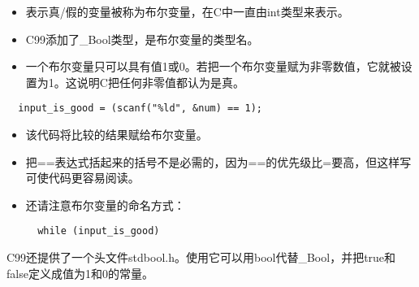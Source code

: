 \begin{frame}[fragile]
\begin{itemize}
\item 表示真/假的变量被称为布尔变量，在C中一直由int类型来表示。\\[0.1in]
\item C99添加了\_Bool类型，是布尔变量的类型名。
\\[0.1in]
\item 一个布尔变量只可以具有值1或0。若把一个布尔变量赋为非零数值，它就被设置为1。这说明C把任何非零值都认为是真。
\end{itemize}

\end{frame}


\begin{frame}


\end{frame}


\begin{frame}[fragile]
\begin{lstlisting}
  input_is_good = (scanf("%ld", &num) == 1);
\end{lstlisting}

\begin{itemize}
\item 该代码将比较的结果赋给布尔变量。\\[0.1in]
\item 把==表达式括起来的括号不是必需的，因为==的优先级比=要高，但这样写可使代码更容易阅读。
\\[0.1in]
\item 还请注意布尔变量的命名方式：
\begin{lstlisting}
  while (input_is_good)
\end{lstlisting}
\end{itemize}

\end{frame}

\begin{frame}[fragile]
C99还提供了一个头文件stdbool.h。使用它可以用bool代替\_Bool，并把true和false定义成值为1和0的常量。
\end{frame}

\begin{frame}

\end{frame}


